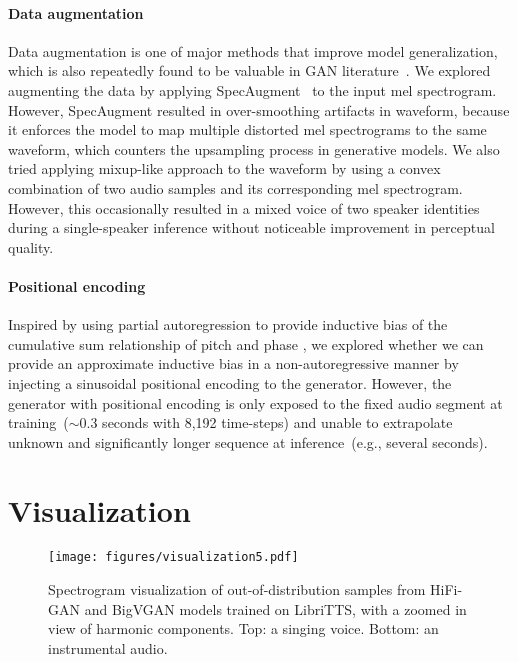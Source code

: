 \documentclass{article} \usepackage{iclr2023_conference,times}
\theoremstyle{plain}
\theoremstyle{definition}
\theoremstyle{remark}
\begin{document}
\paragraph{Data augmentation} Data augmentation is one of major methods that improve model generalization, which is also repeatedly found to be valuable in GAN literature~\citep{karras2020training}. We  explored augmenting the data by applying SpecAugment~\citep{park2019specaugment} to the input mel spectrogram. However, SpecAugment resulted in over-smoothing artifacts in waveform, because it enforces the model to map multiple distorted mel spectrograms to the same waveform, which counters the upsampling process in generative models. We also tried applying mixup-like \citep{zhang2018mixup} approach to the waveform by using a convex combination of two audio samples and its corresponding mel spectrogram. However, this occasionally resulted in a mixed voice of two speaker identities during a single-speaker inference without noticeable improvement in perceptual quality.
\paragraph{Positional encoding} Inspired by using partial autoregression \citep{ping2019waveflow, morrison2021chunked} to provide inductive bias of the cumulative sum relationship of pitch and phase \citep{morrison2021chunked}, we explored whether we can provide an approximate inductive bias in a non-autoregressive manner by injecting a sinusoidal positional encoding \citep{vaswani2017attention} to the generator. 
However, the generator with positional encoding is only exposed to the fixed audio segment at training~($\sim$0.3 seconds with 8,192 time-steps) and unable to extrapolate unknown and significantly longer sequence at inference~(e.g., several seconds).




\section{Visualization}
\label{appendix:visualization}

\begin{figure}[h]
\vspace{.3cm}
\centering
\texttt{[image: figures/visualization5.pdf]}
\vspace{-.5cm}
\caption{Spectrogram visualization of out-of-distribution samples from HiFi-GAN and BigVGAN models trained on LibriTTS, with a zoomed in view of harmonic components. Top: a singing voice. Bottom: an instrumental audio.}
\label{fig_visualization_appendix}
\end{figure}
\end{document}

